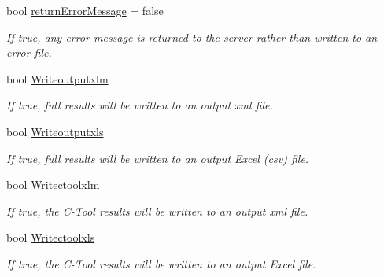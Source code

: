 \begin{DoxyCompactItemize}
\mbox{\label{class_global_vars_ac7a516010a3ce81e1fc2792807bb305d}} 
bool \mbox{\hyperlink{class_global_vars_ac7a516010a3ce81e1fc2792807bb305d}{return\+Error\+Message}} = false
\begin{DoxyCompactList}\small\item\em If true, any error message is returned to the server rather than written to an error file. \end{DoxyCompactList}\item 
\mbox{\label{class_global_vars_a863dc1126b2e5bf517e26a45cf069fbb}} 
bool \mbox{\hyperlink{class_global_vars_a863dc1126b2e5bf517e26a45cf069fbb}{Writeoutputxlm}}
\begin{DoxyCompactList}\small\item\em If true, full results will be written to an output xml file. \end{DoxyCompactList}\item 
\mbox{\label{class_global_vars_a26572bfb2be10514cb90a8dbde59707d}} 
bool \mbox{\hyperlink{class_global_vars_a26572bfb2be10514cb90a8dbde59707d}{Writeoutputxls}}
\begin{DoxyCompactList}\small\item\em If true, full results will be written to an output Excel (csv) file. \end{DoxyCompactList}\item 
\mbox{\label{class_global_vars_a6ff90bb2dc87741b31f307a021fefcda}} 
bool \mbox{\hyperlink{class_global_vars_a6ff90bb2dc87741b31f307a021fefcda}{Writectoolxlm}}
\begin{DoxyCompactList}\small\item\em If true, the C-\/\+Tool results will be written to an output xml file. \end{DoxyCompactList}\item 
\mbox{\label{class_global_vars_ab53683e6475ea986a6c609b7647f2e66}} 
bool \mbox{\hyperlink{class_global_vars_ab53683e6475ea986a6c609b7647f2e66}{Writectoolxls}}
\begin{DoxyCompactList}\small\item\em If true, the C-\/\+Tool results will be written to an output Excel file. \end{DoxyCompactList}\item 

\end{DoxyCompactItemize}
